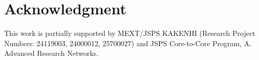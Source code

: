\documentclass[conference]{IEEEtran}
\begin{document}
\section*{Acknowledgment}
This work is partially supported by MEXT/JSPS KAKENHI (Research Project Numbers: 24119003, 24000012, 25700027) and JSPS Core-to-Core Program, A. Advanced Research Networks.



\baselineskip 3.95mm

%
%



%
%
\end{document}
